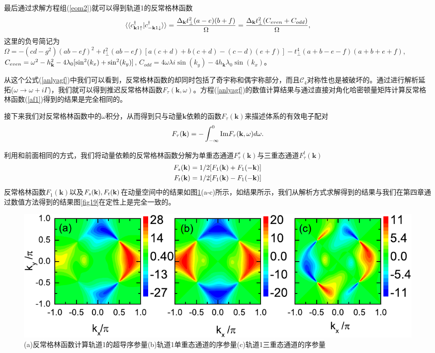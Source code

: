 最后通过求解方程组(\ref{eom2})就可以得到轨道1的反常格林函数
\begin{equation}
\langle\langle c_{{\bf k}1\uparrow}^\dagger|c_{-{\bf k}1\downarrow}^\dagger\rangle\rangle=\frac{\Delta_{\bf k} t_\perp ^2 (a-e) (b+f)}{\Omega}=\frac{\Delta_{\bf k}t_\perp^2(C_{even}+C_{odd})}{\Omega},\label{anlyagf}
\end{equation}
这里的负号简记为 $\Omega=-\left(c d-g^2\right) (a b-e f)^2+t_\perp ^2 (a b-e f) [a (c+d)+b (c+d)-(c-d) (e+f)]-t_\perp ^4 (a+b-e-f) (a+b+e+f)$, $C_{even}=\omega^2-h^2_{\bf{k}}-4\lambda_0[\sin^2(k_x)+\sin^2(k_y)]$, $C_{odd}=4\omega\lambda i\sin(k_y)-4h_{\mathbf{k}}\lambda_0\sin(k_x)$。

从这个公式(\ref{anlyagf})中我们可以看到，反常格林函数的却同时包括了奇宇称和偶宇称部分，而且$\mathcal{C}_4$对称性也是被破坏的。通过进行解析延拓($\omega\rightarrow\omega+i\Gamma$)，我们就可以得到推迟反常格林函数$F_\tau(\mathbf{k},\omega)$。方程(\ref{anlyagf})的数值计算结果与通过直接对角化哈密顿量矩阵计算反常格林函数(\ref{af1})得到的结果是完全相同的。

接下来我们对反常格林函数中的$\omega$积分，从而得到只与动量$\mathbf{k}$依赖的函数$F_\tau(\mathbf{k})$来描述体系的有效电子配对
\begin{equation}
F_\tau({\bf k})=-\int_{-\infty}^0\mathrm{Im}F_\tau({\bf k},\omega)d\omega.
\end{equation}

利用和前面相同的方式，我们将动量依赖的反常格林函数分解为单重态通道$F^s_\tau(\mathbf{k})$与三重态通道$F^t_\tau(\mathbf{k})$
\begin{equation}
\begin{aligned}
F_s({\bf k})&=1/2[F_1({\bf k})+F_1(-{\bf k})]\\
F_t({\bf k})&=1/2[F_1({\bf k})-F_1(-{\bf k})]
\end{aligned}
\end{equation}
反常格林函数$F_1(\mathbf{k})$以及$F_s({\bf k}),F_t({\bf k})$在动量空间中的结果如图\ref{fig21}(a-c)所示，如结果所示，我们从解析方式求解得到的结果与我们在第四章通过数值方法得到的结果图\ref{fig19}在定性上是完全一致的。
\begin{figure}[h]
\centering
\includegraphics[scale=0.8]{pic/fig22}
\caption{(a)反常格林函数计算轨道1的超导序参量(b)轨道1单重态通道的序参量(c)轨道1三重态通道的序参量}\label{fig21}
\end{figure}

